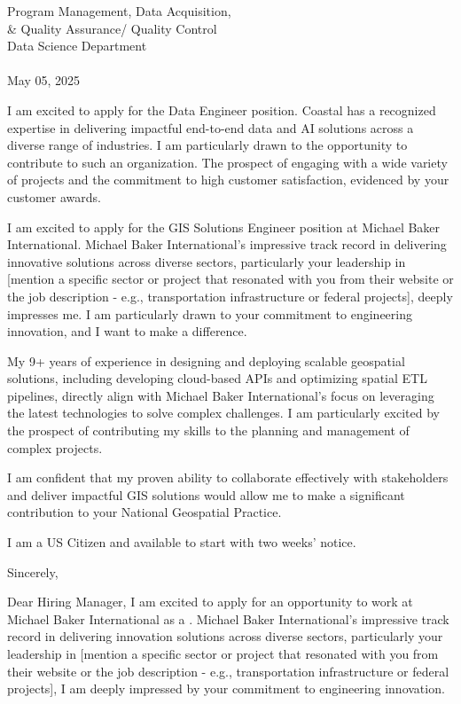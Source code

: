 \documentclass[letterpaper]{article}
\begin{document}
\large
Program Management, Data Acquisition, \\
\qquad \& Quality Assurance/ Quality Control \\
Data Science Department \\
\textbf{\JobCompany} \\

\null\hfill May 05, 2025

I am excited to apply for the Data Engineer position.
Coastal has a recognized expertise in delivering impactful end-to-end data and
AI solutions across a diverse range of industries. I am particularly drawn to
the opportunity to contribute to such an organization. The prospect of engaging
with a wide variety of projects and the commitment to high customer
satisfaction, evidenced by your customer awards.

I am excited to apply for the GIS Solutions Engineer position at Michael Baker International. Michael Baker International's impressive track record in delivering innovative solutions across diverse sectors, particularly your leadership in [mention a specific sector or project that resonated with you from their website or the job description - e.g., transportation infrastructure or federal projects], deeply impresses me. I am particularly drawn to your commitment to engineering innovation, and I want to make a difference.

My 9+ years of experience in designing and deploying scalable geospatial solutions, including developing cloud-based APIs and optimizing spatial ETL pipelines, directly align with Michael Baker International's focus on leveraging the latest technologies to solve complex challenges. I am particularly excited by the prospect of contributing my skills to the planning and management of complex projects.

I am confident that my proven ability to collaborate effectively with stakeholders and deliver impactful GIS solutions would allow me to make a significant contribution to your National Geospatial Practice.

I am a US Citizen and available to start with two weeks' notice.

Sincerely,


Dear Hiring Manager,
I am excited to apply for an opportunity to work at Michael Baker International as a \JobTitle.
Michael Baker International's impressive track record in delivering innovation solutions across diverse sectors, 
particularly your leadership in [mention a
specific sector or project that resonated with you from their website or the
job description - e.g., transportation infrastructure or federal projects], I
am deeply impressed by your commitment to engineering innovation.
\end{document}
